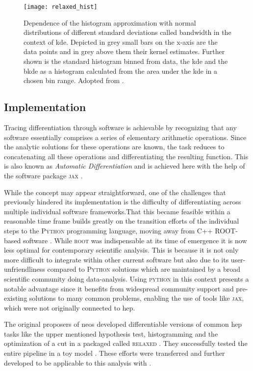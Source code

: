 \begin{figure}
    \centering
    \texttt{[image: relaxed\_hist]}
    \caption[]{Dependence of the histogram approximation with normal distributions of different standard deviations called bandwidth in the context of \ac{kde}. Depicted in grey small bars on the x-axis are the data points and in grey above them their kernel estimates. Further shown is the standard histogram binned from data, the \ac{kde} and the \ac{bkde} as a histogram calculated from the area under the \ac{kde} in a chosen bin range. Adopted from \citep{Simpson_2023}.}
    \label{fig:relaxed_hist}
\end{figure}


\subsection{Implementation}
Tracing differentiation through software is achievable by recognizing that any software essentially comprises a series of elementary arithmetic operations. Since the analytic solutions for these operations are known, the task reduces to concatenating all these operations and differentiating the resulting function. This is also known as \textit{Automatic Differentiation} and is achieved here with the help of the software package \textsc{jax} \citep{jax2018github}.

While the concept may appear straightforward, one of the challenges that previously hindered its implementation is the difficulty of differentiating across multiple individual software frameworks.That this became feasible within a reasonable time frame builds greatly on the transition efforts  of the individual steps to the \textsc{Python} programming language, moving away from C++ \textsc{ROOT}-based software \citep{ANTCHEVA20092499}. While \textsc{root} was indispensable at its time of emergence it is now less optimal for contemporary scientific analysis. This is because it is not only more difficult to integrate within other current software but also due to its user-unfriendliness compared to \textsc{Python} solutions which are maintained by a broad scientific community doing data-analysis. Using \textsc{python} in this context presents a notable advantage since it benefits from widespread community support and pre-existing solutions to many common problems, enabling the use of tools like \textsc{jax}, which were not originally connected to \ac{hep}.


The original proposers \citet{Simpson_2023} of \ac{neos} developed differentiable versions of common \ac{hep} tasks like the upper mentioned hypothesis test, histogramming and the optimization of a cut in a packaged called \textsc{relaxed} \citep{Simpson_relaxed_version_0_3_0_2023}. They successfully tested the entire pipeline in a toy model \citep{Simpson_neos_version_0_2_0_2021}. These efforts were transferred and further developed to be applicable to this analysis with \citep{hh_neos}.



